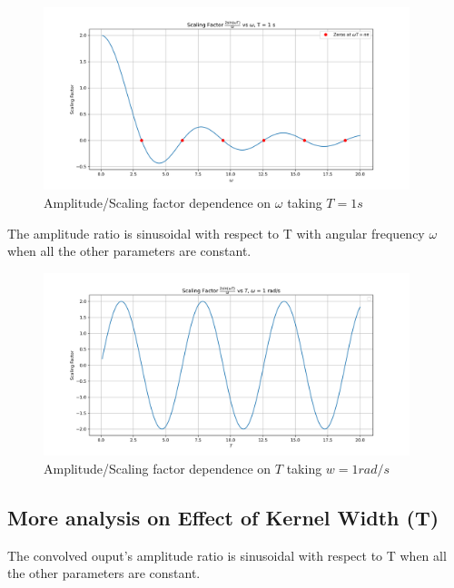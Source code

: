 \begin{figure}[!ht]
    \begin{center}
        \includegraphics[width=0.95\textwidth]{codes/codes_sin_3_and_smoothening/figs/scaling_factor_analysis.png}
    \end{center}
    \caption{Amplitude/Scaling factor dependence on $\omega$ taking $T = 1s$}
\end{figure}
\FloatBarrier

The amplitude ratio is sinusoidal with respect to T with angular frequency $\omega$ when all the other parameters are constant.

\begin{figure}[!ht]
    \begin{center}
        \includegraphics[width=0.95\textwidth]{codes/codes_sin_3_and_smoothening/figs/scaling_factor_analysis_T.png}
    \end{center}
    \caption{Amplitude/Scaling factor dependence on $T$ taking $w = 1 rad/s$}
\end{figure}
\FloatBarrier

\subsection{More analysis on Effect of Kernel Width (T)}
The convolved ouput's amplitude ratio is sinusoidal with respect to T when all the other parameters are constant.

